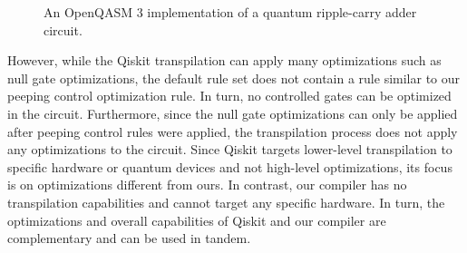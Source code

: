\begin{figure}[htp]
    \centering     
    
    \caption{An OpenQASM 3 implementation of a quantum ripple-carry adder circuit.}
    \label{fig:eval_adder_qasm}
\end{figure}

However, while the Qiskit transpilation can apply many optimizations such as null gate optimizations, the default rule set does not contain a rule similar to our peeping control optimization rule. In turn, no controlled gates can be optimized in the circuit. Furthermore, since the null gate optimizations can only be applied after peeping control rules were applied, the transpilation process does not apply any optimizations to the circuit. Since Qiskit targets lower-level transpilation to specific hardware or quantum devices and not high-level optimizations, its focus is on optimizations different from ours. In contrast, our compiler has no transpilation capabilities and cannot target any specific hardware. In turn, the optimizations and overall capabilities of Qiskit and our compiler are complementary and can be used in tandem.
